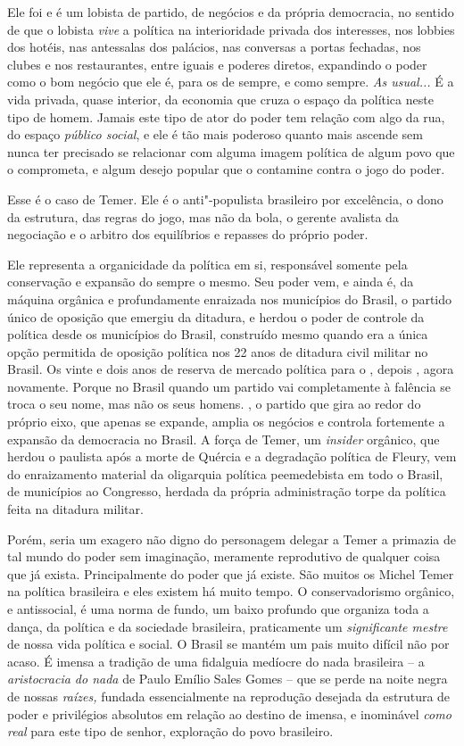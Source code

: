Ele foi e é um lobista de partido, de negócios e da própria democracia,
no sentido de que o lobista \emph{vive} a política na interioridade
privada dos interesses, nos lobbies dos hotéis, nas antessalas dos
palácios, nas conversas a portas fechadas, nos clubes e nos
restaurantes, entre iguais e poderes diretos, expandindo o poder como o
bom negócio que ele é, para os de sempre, e como sempre. \emph{As
usual...} É a vida privada, quase interior, da economia que cruza o
espaço da política neste tipo de homem. Jamais este tipo de ator do
poder tem relação com algo da rua, do espaço \emph{público social}, e
ele é tão mais poderoso quanto mais ascende sem nunca ter precisado se
relacionar com alguma imagem política de algum povo que o comprometa, e
algum desejo popular que o contamine contra o jogo do poder.

Esse é o caso de Temer. Ele é o anti"-populista brasileiro por
excelência, o dono da estrutura, das regras do jogo, mas não da bola, o
gerente avalista da negociação e o arbitro dos equilíbrios e repasses do
próprio poder.

Ele representa a organicidade da política em si, responsável somente
pela conservação e expansão do sempre o mesmo. Seu poder vem, e ainda é,
da máquina orgânica e profundamente enraizada nos municípios do Brasil,
o partido único de oposição que emergiu da ditadura, e herdou o poder de
controle da política desde os municípios do Brasil, construído mesmo
quando era a única opção permitida de oposição política nos 22 anos de
ditadura civil militar no Brasil. Os vinte e dois anos de reserva de
mercado política para o , depois ,
agora  novamente. Porque no
Brasil quando um partido vai completamente à falência se troca o seu nome, mas não
os seus homens. , o partido que gira ao redor do próprio eixo, que
apenas se expande, amplia os negócios e controla fortemente a expansão
da democracia no Brasil. A força de Temer, um \emph{insider} orgânico,
que herdou o  paulista após a morte de Quércia e a degradação
política de Fleury, vem do enraizamento material da oligarquia política
peemedebista em todo o Brasil, de municípios ao Congresso, herdada da
própria administração torpe da política feita na ditadura militar.

Porém, seria um exagero não digno do personagem delegar a Temer a
primazia de tal mundo do poder sem imaginação, meramente reprodutivo de
qualquer coisa que já exista. Principalmente do poder que já existe. São
muitos os Michel Temer na política brasileira e eles existem há muito
tempo. O conservadorismo orgânico, e antissocial, é uma norma de fundo,
um baixo profundo que organiza toda a dança, da política e da sociedade
brasileira, praticamente um \emph{significante mestre} de nossa vida
política e social. O Brasil se mantém um pais muito difícil não por
acaso. É imensa a tradição de uma fidalguia medíocre do nada brasileira
-- a \emph{aristocracia do nada} de Paulo Emílio Sales Gomes -- que se
perde na noite negra de nossas \emph{raízes,} fundada essencialmente na
reprodução desejada da estrutura de poder e privilégios absolutos em
relação ao destino de imensa, e inominável \emph{como real} para este
tipo de senhor, exploração do povo brasileiro.

